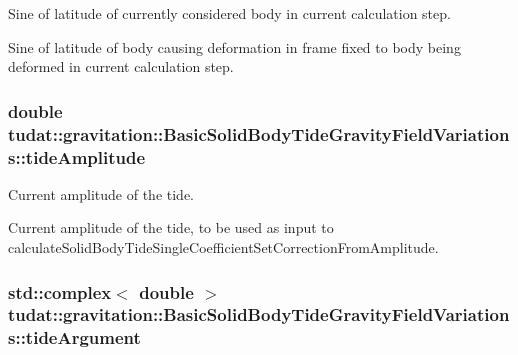 Sine of latitude of currently considered body in current calculation step. 

Sine of latitude of body causing deformation in frame fixed to body being deformed in current calculation step. 
\subsubsection[{\texorpdfstring{tide\+Amplitude}{tideAmplitude}}]{\setlength{\rightskip}{0pt plus 5cm}double tudat\+::gravitation\+::\+Basic\+Solid\+Body\+Tide\+Gravity\+Field\+Variations\+::tide\+Amplitude\hspace{0.3cm}{\ttfamily [protected]}}\hypertarget{classtudat_1_1gravitation_1_1BasicSolidBodyTideGravityFieldVariations_a6b196974e5ec21765cbf3d0c6054be11}{}\label{classtudat_1_1gravitation_1_1BasicSolidBodyTideGravityFieldVariations_a6b196974e5ec21765cbf3d0c6054be11}


Current amplitude of the tide. 

Current amplitude of the tide, to be used as input to calculate\+Solid\+Body\+Tide\+Single\+Coefficient\+Set\+Correction\+From\+Amplitude. 
\subsubsection[{\texorpdfstring{tide\+Argument}{tideArgument}}]{\setlength{\rightskip}{0pt plus 5cm}std\+::complex$<$ double $>$ tudat\+::gravitation\+::\+Basic\+Solid\+Body\+Tide\+Gravity\+Field\+Variations\+::tide\+Argument\hspace{0.3cm}{\ttfamily [protected]}}\hypertarget{classtudat_1_1gravitation_1_1BasicSolidBodyTideGravityFieldVariations_aace888d4e6e5dde87704145b40913294}{}\label{classtudat_1_1gravitation_1_1BasicSolidBodyTideGravityFieldVariations_aace888d4e6e5dde87704145b40913294}


